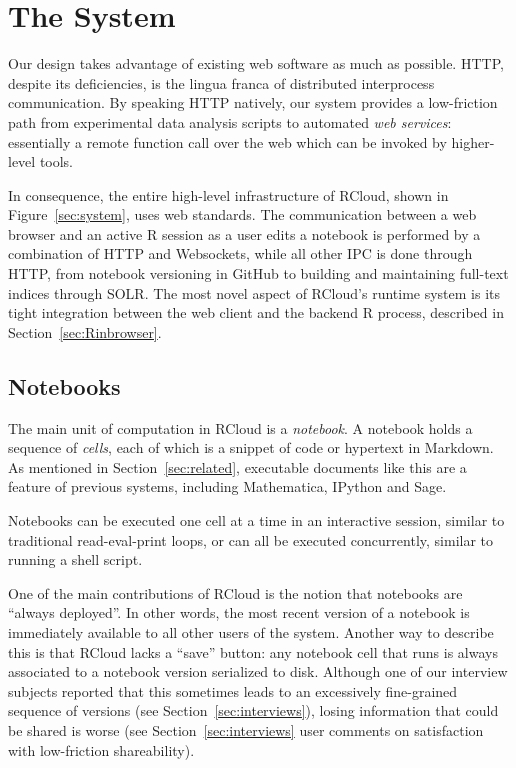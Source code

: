 \section{The System\label{sec:system}}

Our design takes advantage of existing web software as much as possible.
HTTP, despite its deficiencies, is the lingua franca of distributed
interprocess communication. By speaking HTTP natively, our system
provides a low-friction path from experimental data analysis scripts
to automated \emph{web services}: essentially a remote function call over
the web which can be invoked by higher-level tools.

In consequence, the entire high-level infrastructure of RCloud, shown
in Figure~\ref{sec:system}, uses web standards. The communication between
a web browser and an active R session as a user edits a notebook is
performed by a combination of HTTP and Websockets, while all other IPC
is done through HTTP, from notebook versioning in GitHub to building and
maintaining full-text indices through SOLR. The most novel aspect
of RCloud's runtime system is its tight integration between the web client
and the backend R process, described in Section~\ref{sec:Rinbrowser}.

\subsection{Notebooks\label{sec:notebooks}}

The main unit of computation in RCloud is a \emph{notebook}.  A
notebook holds a sequence of \emph{cells}, each of which is a snippet
of code or hypertext in Markdown. As mentioned in
Section~\ref{sec:related}, executable documents like
this are a feature of previous systems, including Mathematica,
IPython and Sage.

Notebooks can be executed one cell at a time in an interactive
session, similar to traditional read-eval-print
loops, or can all be executed concurrently,
similar to running a shell script.

One of the main contributions of RCloud is the notion that notebooks are
``always deployed''. In other words, the most recent version of a
notebook is immediately available to all other users of the system.
Another way to describe this is that
RCloud lacks a ``save'' button: any notebook cell that runs is always
associated to a notebook version serialized to disk. Although one of
our interview subjects reported that this sometimes leads to an
excessively fine-grained sequence of versions (see
Section~\ref{sec:interviews}), 
losing information that could be shared is worse (see
Section~\ref{sec:interviews} user comments on
satisfaction with low-friction shareability).

